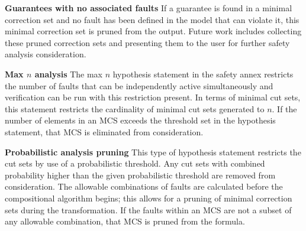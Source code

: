 \textbf{Guarantees with no associated faults} If a guarantee is found in a minimal correction set and no fault has been defined in the model that can violate it, this minimal correction set is pruned from the output. Future work includes collecting these pruned correction sets and presenting them to the user for further safety analysis consideration.

\textbf{Max $n$ analysis} The max $n$ hypothesis statement in the safety annex restricts the number of faults that can be independently active simultaneously and verification can be run with this restriction present. In terms of minimal cut sets, this statement restricts the cardinality of minimal cut sets generated to $n$. If the number of elements in an MCS exceeds the threshold set in the hypothesis statement, that MCS is eliminated from consideration.


\textbf{Probabilistic analysis pruning} This type of hypothesis statement restricts the cut sets by use of a probabilistic threshold. Any cut sets with combined probability higher than the given probabilistic threshold are removed from consideration. The allowable combinations of faults are calculated before the compositional algorithm begins; this allows for a pruning of minimal correction sets during the transformation. If the faults within an MCS are not a subset of any allowable combination, that MCS is pruned from the formula. 








